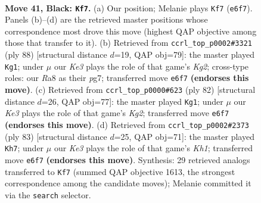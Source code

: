 \documentclass[11pt]{article}
\begin{document}
\clearpage

\begin{figure}[p]\centering
\begin{subfigure}{0.46\textwidth}\centering
\resizebox{\linewidth}{!}{%
\newchessgame
\chessboard[
  setfen={r7/8/4kp2/3p4/5P2/p3Q1P1/P5KP/q7 b - - 2 41},
  showmover=false,
  pgfstyle=straightmove, color=movearrow, markmove={e6-f7}
]}
\caption{}
\end{subfigure}\hfill
\begin{subfigure}{0.46\textwidth}\centering
\resizebox{\linewidth}{!}{%
\newchessgame
\chessboard[
  setfen={8/4kpp1/1Q2p3/2Pq2pP/8/6P1/5PK1/8 w - - 11 45},
  showmover=false,
  pgfstyle=straightmove, color=movearrow, markmove={g2-g1}
]}
\caption{}
\end{subfigure}
\\[4pt]
\begin{subfigure}{0.46\textwidth}\centering
\resizebox{\linewidth}{!}{%
\newchessgame
\chessboard[
  setfen={6k1/5p2/4p2Q/3q2p1/6P1/7P/5PK1/8 w - - 2 42},
  showmover=false,
  pgfstyle=straightmove, color=movearrow, markmove={g2-g1}
]}
\caption{}
\end{subfigure}\hfill
\begin{subfigure}{0.46\textwidth}\centering
\resizebox{\linewidth}{!}{%
\newchessgame
\chessboard[
  setfen={4Q2k/6p1/8/8/Pr6/6P1/1p3PKP/1q6 b - - 1 42},
  showmover=false,
  pgfstyle=straightmove, color=movearrow, markmove={h8-h7}
]}
\caption{}
\end{subfigure}
\caption{\textbf{Move 41, Black: \texttt{Kf7}.} (a) Our position; Melanie plays \texttt{Kf7} (\texttt{e6f7}). Panels (b)--(d) are the retrieved master positions whose correspondence most drove this move (highest QAP objective among those that transfer to it). (b) Retrieved from \texttt{ccrl\_top\_p0002\#3321} (ply 88) [structural distance $d$=19, QAP obj=79]: the master played \texttt{Kg1}; under $\mu$ our \emph{Ke3} plays the role of that game's \emph{Kg2}; cross-type roles: our \emph{R}a8 as their \emph{p}g7; transferred move \texttt{e6f7} \textbf{(endorses this move)}. (c) Retrieved from \texttt{ccrl\_top\_p0000\#623} (ply 82) [structural distance $d$=26, QAP obj=77]: the master played \texttt{Kg1}; under $\mu$ our \emph{Ke3} plays the role of that game's \emph{Kg2}; transferred move \texttt{e6f7} \textbf{(endorses this move)}. (d) Retrieved from \texttt{ccrl\_top\_p0002\#2373} (ply 83) [structural distance $d$=25, QAP obj=71]: the master played \texttt{Kh7}; under $\mu$ our \emph{Ke3} plays the role of that game's \emph{Kh1}; transferred move \texttt{e6f7} \textbf{(endorses this move)}. Synthesis: 29 retrieved analogs transferred to \texttt{Kf7} (summed QAP objective 1613, the strongest correspondence among the candidate moves); Melanie committed it via the \texttt{search} selector.}
\label{fig:thought-m81}
\end{figure}
\end{document}
